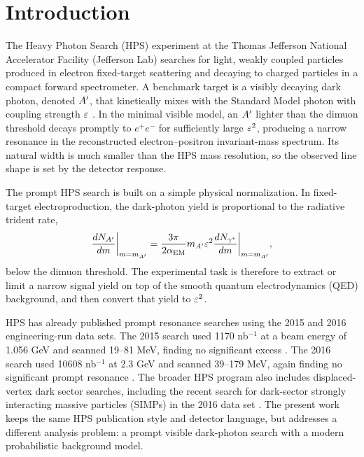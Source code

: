 \section{Introduction}
\label{sec:introduction}

The Heavy Photon Search (HPS) experiment at the Thomas Jefferson National Accelerator
Facility (Jefferson Lab) searches for light, weakly coupled particles produced in
electron fixed-target scattering and decaying to charged particles in a compact
forward spectrometer. A benchmark target is a visibly decaying dark photon, denoted
$A^{\prime}$, that kinetically mixes with the Standard Model photon with coupling strength
$\varepsilon$ \cite{Holdom1986,EssigEtAl2011,Fabbrichesi2020DarkPhoton}. In the minimal
visible model, an $A^{\prime}$ lighter than the dimuon threshold decays promptly to
$e^+e^-$ for sufficiently large $\varepsilon^2$, producing a narrow resonance in the
reconstructed electron--positron invariant-mass spectrum. Its natural width is much
smaller than the HPS mass resolution, so the observed line shape is set by the
detector response.

The prompt HPS search is built on a simple physical normalization. In fixed-target
electroproduction, the dark-photon yield is proportional to the radiative trident
rate,
\begin{equation}
\frac{dN_{A^{\prime}}}{dm}\bigg|_{m=m_{A^{\prime}}}
=
\frac{3\pi}{2\alpha_{\mathrm{EM}}}
m_{A^{\prime}}\varepsilon^2
\frac{dN_{\gamma^\ast}}{dm}\bigg|_{m=m_{A^{\prime}}},
\label{eq:intro-ap-yield}
\end{equation}
below the dimuon threshold. The experimental task is therefore to extract or limit a
narrow signal yield on top of the smooth quantum electrodynamics (QED) background, and
then convert that yield to $\varepsilon^2$.

HPS has already published prompt resonance searches using the 2015 and 2016
engineering-run data sets. The 2015 search used 1170 nb$^{-1}$ at a beam energy of
1.056 GeV and scanned 19--81 MeV, finding no significant excess
\cite{HPS2015DarkPhoton}. The 2016 search used 10608 nb$^{-1}$ at 2.3 GeV and scanned
39--179 MeV, again finding no significant prompt resonance
\cite{HPS2016PromptLong}. The broader HPS program also includes displaced-vertex dark
sector searches, including the recent search for dark-sector strongly interacting
massive particles (SIMPs) in the 2016 data set \cite{HPSSIMP2025}. The present work
keeps the same HPS publication style and detector language, but addresses a different
analysis problem: a prompt visible dark-photon search with a modern probabilistic
background model.

